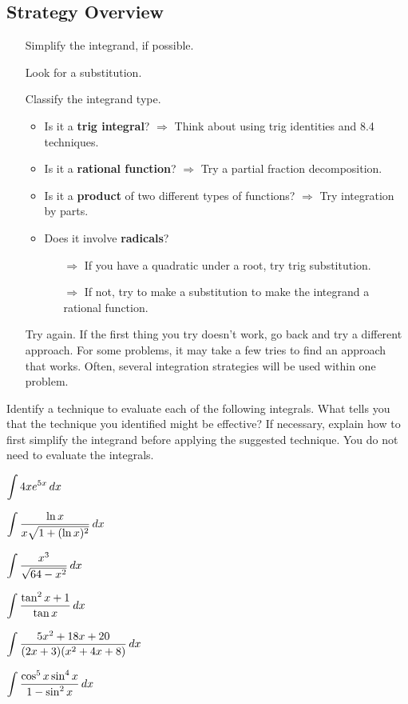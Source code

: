 \documentclass[12pt]{article}
\begin{document}
\subsection*{Strategy Overview}
\begin{itemize}
\item[\tc{1}] Simplify the integrand, if possible.
\item[\tc{2}] Look for a substitution.
\item[\tc{3}] Classify the integrand type.
\begin{itemize}
	\item Is it a \textbf{trig integral}? $\Longrightarrow$ Think about using trig identities and 8.4 techniques.
	\item Is it a \textbf{rational function}? $\Longrightarrow$ Try a partial fraction decomposition.
	\item Is it a \textbf{product} of two different types of functions? $\Longrightarrow$ Try integration by parts.
	\item Does it involve \textbf{radicals}? 
	\begin{itemize}		\item[$\Longrightarrow$] If you have a quadratic under a root, try trig substitution.
	\item[$\Longrightarrow$] If not, try to make a substitution to make the integrand a rational function.
	\end{itemize}
\end{itemize}
\item[\tc{4}] Try again. If the first thing you try doesn't work, go back and try a different approach. For some problems, it may take a few tries to find an approach that works. Often, several integration strategies will be used within one problem.
\end{itemize}

\newpage

Identify a technique to evaluate each of the following integrals. What tells you that the technique you identified might be effective? If necessary, explain how to first simplify the integrand before applying the suggested technique. You do not need to evaluate the integrals.

\Example $\displaystyle\int 4xe^{5x}\,dx$

\vfill

\Example $\displaystyle\int\frac{\ln x}{x\sqrt{1+(\ln x)^2}}\,dx$

\vfill

\Example $\displaystyle\int\frac{x^3}{\sqrt{64-x^2}}\,dx$
\vfill

\newpage

\Example $\displaystyle\int\frac{\tan^2x+1}{\tan x}\,dx$

\vfill

\Example $\displaystyle\int\frac{5x^2+18x+20}{(2x+3)(x^2+4x+8)}\,dx$

\vfill

\Example $\displaystyle\int\frac{\cos^5x\sin^4x}{1-\sin^2x}\,dx$

\vfill
\end{document}
